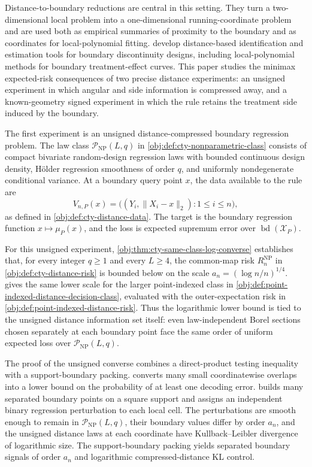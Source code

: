 \documentclass[11pt]{article}
\begin{document}
Distance-to-boundary reductions are central in this setting. They turn a two-dimensional local problem into a one-dimensional running-coordinate problem and are used both as empirical summaries of proximity to the boundary and as coordinates for local-polynomial fitting. \citet{CattaneoTitiunikYu2026Distance} develop distance-based identification and estimation tools for boundary discontinuity designs, including local-polynomial methods for boundary treatment-effect curves. This paper studies the minimax expected-risk consequences of two precise distance experiments: an unsigned experiment in which angular and side information is compressed away, and a known-geometry signed experiment in which the rule retains the treatment side induced by the boundary.

The first experiment is an unsigned distance-compressed boundary regression problem. The law class \(\mathcal P_{\mathrm{NP}}(L,q)\) in \cref{obj:def:cty-nonparametric-class} consists of compact bivariate random-design regression laws with bounded continuous design density, Hölder regression smoothness of order \(q\), and uniformly nondegenerate conditional variance. At a boundary query point \(x\), the data available to the rule are
\[
V_{n,P}(x)=\bigl((Y_i,\lVert X_i-x\rVert_2):1\leq i\leq n\bigr),
\]
as defined in \cref{obj:def:cty-distance-data}. The target is the boundary regression function \(x\mapsto\mu_P(x)\), and the loss is expected supremum error over \(\operatorname{bd}(\mathcal X_P)\).

For this unsigned experiment, \cref{obj:thm:cty-same-class-log-converse} establishes that, for every integer \(q\ge1\) and every \(L\ge4\), the common-map risk \(R_n^{\mathrm{NP}}\) in \cref{obj:def:cty-distance-risk} is bounded below on the scale \(a_n=(\log n/n)^{1/4}\).  gives the same lower scale for the larger point-indexed class in \cref{obj:def:point-indexed-distance-decision-class}, evaluated with the outer-expectation risk in \cref{obj:def:point-indexed-distance-risk}. Thus the logarithmic lower bound is tied to the unsigned distance information set itself: even law-independent Borel sections chosen separately at each boundary point face the same order of uniform expected loss over \(\mathcal P_{\mathrm{NP}}(L,q)\).

The proof of the unsigned converse combines a direct-product testing inequality with a support-boundary packing.  converts many small coordinatewise overlaps into a lower bound on the probability of at least one decoding error.  builds many separated boundary points on a square support and assigns an independent binary regression perturbation to each local cell. The perturbations are smooth enough to remain in \(\mathcal P_{\mathrm{NP}}(L,q)\), their boundary values differ by order \(a_n\), and the unsigned distance laws at each coordinate have Kullback--Leibler divergence of logarithmic size. The support-boundary packing yields separated boundary signals of order \(a_n\) and logarithmic compressed-distance KL control.
\end{document}
